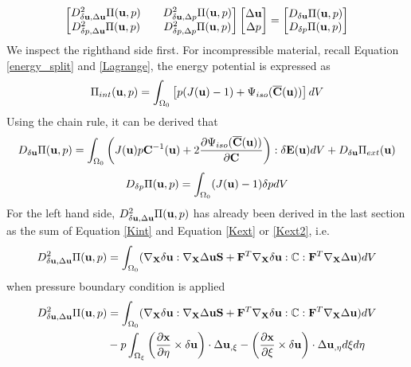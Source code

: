 \begin{equation} \label{linear}
\begin{bmatrix}
D_{\delta\bold{u}, \Delta\bold{u}}^2 \Pi(\bold{u}, p)  && D_{\delta\bold{u}, \Delta{p}}^2 \Pi(\bold{u}, p)  \\ D_{\delta{p}, \Delta\bold{u}}^2 \Pi(\bold{u}, p)  && D_{\delta{p}, \Delta{p}}^2 \Pi(\bold{u}, p) 
\end{bmatrix}
\begin{bmatrix}
\Delta\bold{u} \\ \Delta{p}
\end{bmatrix}
= 
\begin{bmatrix}
D_{\delta\bold{u}}\Pi(\bold{u}, p) \\ D_{\delta{p}}\Pi(\bold{u}, p) 
\end{bmatrix}
\end{equation}
We inspect the righthand side first. For incompressible material, recall Equation \ref{energy_split} and \ref{Lagrange}, the energy potential is expressed as
\begin{equation} \label{split3}
\Pi_{int}(\bold{u}, p) = \int_{\Omega_0} \left[ p(J(\bold{u}) - 1) + \Psi_{iso}(\overline{\bold{C}}(\bold{u}))\right] dV
\end{equation}
Using the chain rule, it can be derived that
\begin{equation}\label{rhs1}
D_{\delta\bold{u}}\Pi(\bold{u}, p) = \int_{\Omega_0}\left( J(\bold{u})p\bold{C}^{-1}(\bold{u}) + 
2\frac{\partial{\Psi_{iso}(\overline{\bold{C}}(\bold{u}))}}{\partial{\bold{C}}}  \right) : \delta\bold{E}(\bold{u}) dV + D_{\delta\bold{u}}\Pi_{ext}(\bold{u})
\end{equation}
\begin{equation}\label{rhs2}
D_{\delta{p}}\Pi(\bold{u}, p) = \int_{\Omega_0} (J(\bold{u}) - 1 )\delta{p} dV
\end{equation}
For the left hand side, $D_{\delta\bold{u}, \Delta\bold{u}}^2 \Pi(\bold{u}, p)$ has already been derived in the last section as the sum of Equation \ref{Kint} and Equation \ref{Kext} or \ref{Kext2}, i.e.
\begin{equation} \label{lhs0}
D_{\delta\bold{u}, \Delta\bold{u}}^2 \Pi(\bold{u}, p) =  \int_{\Omega_0}(\nabla_{\bold{X}}\delta\bold{u} : \nabla_{\bold{X}}\Delta\bold{u}\bold{S} + \bold{F}^T\nabla_{\bold{X}}\delta{\bold{u}} : \mathbb{C} : \bold{F}^T \nabla_{\bold{X}}\Delta\bold{u})dV  \end{equation}
when pressure boundary condition is applied
\begin{equation} \label{lhs1}
\begin{split}
D_{\delta\bold{u}, \Delta\bold{u}}^2 \Pi(\bold{u}, p) 
&= \int_{\Omega_0}(\nabla_{\bold{X}}\delta\bold{u} : \nabla_{\bold{X}}\Delta\bold{u}\bold{S} + \bold{F}^T\nabla_{\bold{X}}\delta{\bold{u}} : \mathbb{C} : \bold{F}^T \nabla_{\bold{X}}\Delta\bold{u})dV  \\
&-  p\int_{\Omega_{\xi}}  \left(\frac{\partial{\bold{x}}}{\partial{\eta}} \times \delta\bold{u}\right) \cdot\Delta{\bold{u}}_{,\xi} - 
\left(\frac{\partial{\bold{x}}}{\partial{\xi}} \times \delta\bold{u}\right) \cdot\Delta{\bold{u}}_{,\eta} d\xi{d\eta}
\end{split}
\end{equation}
